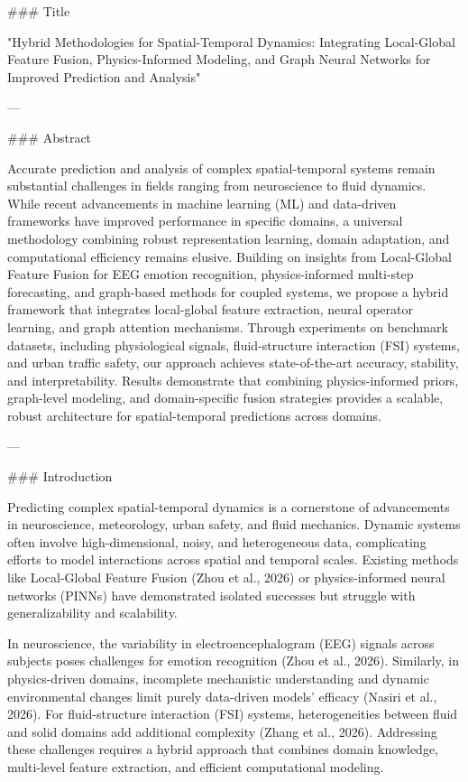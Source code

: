 ### Title

"Hybrid Methodologies for Spatial-Temporal Dynamics: Integrating Local-Global Feature Fusion, Physics-Informed Modeling, and Graph Neural Networks for Improved Prediction and Analysis"

---

### Abstract

Accurate prediction and analysis of complex spatial-temporal systems remain substantial challenges in fields ranging from neuroscience to fluid dynamics. While recent advancements in machine learning (ML) and data-driven frameworks have improved performance in specific domains, a universal methodology combining robust representation learning, domain adaptation, and computational efficiency remains elusive. Building on insights from Local-Global Feature Fusion for EEG emotion recognition, physics-informed multi-step forecasting, and graph-based methods for coupled systems, we propose a hybrid framework that integrates local-global feature extraction, neural operator learning, and graph attention mechanisms. Through experiments on benchmark datasets, including physiological signals, fluid-structure interaction (FSI) systems, and urban traffic safety, our approach achieves state-of-the-art accuracy, stability, and interpretability. Results demonstrate that combining physics-informed priors, graph-level modeling, and domain-specific fusion strategies provides a scalable, robust architecture for spatial-temporal predictions across domains.

---

### Introduction

Predicting complex spatial-temporal dynamics is a cornerstone of advancements in neuroscience, meteorology, urban safety, and fluid mechanics. Dynamic systems often involve high-dimensional, noisy, and heterogeneous data, complicating efforts to model interactions across spatial and temporal scales. Existing methods like Local-Global Feature Fusion (Zhou et al., 2026) or physics-informed neural networks (PINNs) have demonstrated isolated successes but struggle with generalizability and scalability.

In neuroscience, the variability in electroencephalogram (EEG) signals across subjects poses challenges for emotion recognition (Zhou et al., 2026). Similarly, in physics-driven domains, incomplete mechanistic understanding and dynamic environmental changes limit purely data-driven models' efficacy (Nasiri et al., 2026). For fluid-structure interaction (FSI) systems, heterogeneities between fluid and solid domains add additional complexity (Zhang et al., 2026). Addressing these challenges requires a hybrid approach that combines domain knowledge, multi-level feature extraction, and efficient computational modeling.

